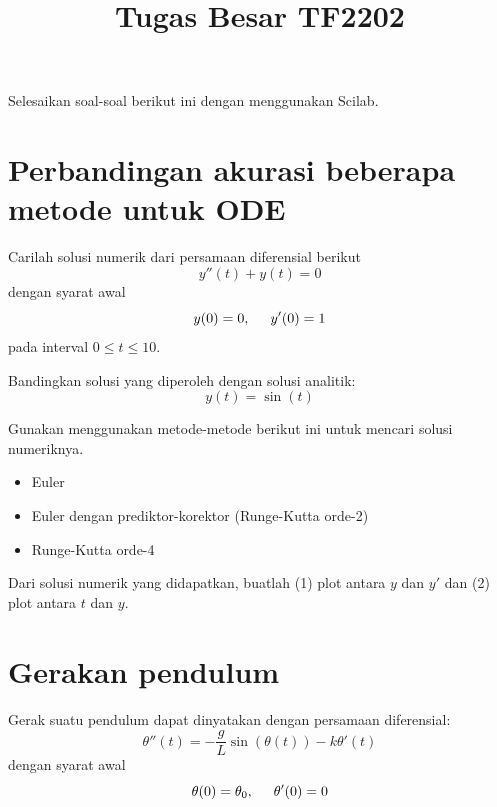 \documentclass[12pt,bahasa]{article}
\begin{document}
\title{Tugas Besar TF2202}
\date{}
\maketitle


Selesaikan soal-soal berikut ini dengan menggunakan Scilab.

\section{Perbandingan akurasi beberapa metode untuk ODE}

Carilah solusi numerik dari persamaan diferensial berikut
\begin{equation}
y''(t) + y(t) = 0
\end{equation}
dengan syarat awal
\begin{equation}
y(0) = 0, \hspace{0.5cm} y'(0) = 1
\end{equation}
pada interval $0 \leq t \leq 10$.

Bandingkan solusi yang diperoleh dengan solusi analitik:
\begin{equation}
y(t) = \sin(t)
\end{equation}

Gunakan menggunakan metode-metode berikut ini untuk mencari solusi numeriknya.
\begin{itemize}
\item Euler
\item Euler dengan prediktor-korektor (Runge-Kutta orde-2)
\item Runge-Kutta orde-4
\end{itemize}

Dari solusi numerik yang didapatkan, buatlah (1) plot antara $y$ dan $y'$
dan (2) plot antara $t$ dan $y$.

\section{Gerakan pendulum}

Gerak suatu pendulum dapat dinyatakan dengan persamaan diferensial:
\begin{equation}
\theta''(t) = -\frac{g}{L}\sin(\theta(t)) - k\theta'(t)
\end{equation}
dengan syarat awal
\begin{equation}
\theta(0) = \theta_0, \hspace{0.5cm} \theta'(0) = 0
\end{equation}
\end{document}
